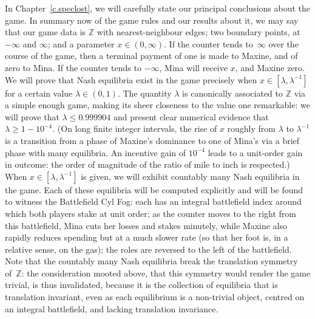 \documentclass[letterpaper,11pt,oneside,reqno]{amsbook}
\newcommand{\Z}{\ensuremath{\mathbb{Z}}}
\numberwithin{figure}{chapter}
\theoremstyle{definition}
\theoremstyle{definition}
\theoremstyle{definition}
\theoremstyle{definition}
\theoremstyle{definition}
\begin{document}
 In Chapter~\ref{c.speclost}, we will 
  carefully state our principal conclusions about the game. In summary now of the game rules and our results about it, we may say that
 our game data is $\Z$ with nearest-neighbour edges; two boundary points, at $-\infty$ and $\infty$; and a parameter $x \in (0,\infty)$. 
  If the counter tends to~$\infty$ over the course of the game, then a
  terminal payment of one is made to Maxine, and of zero to Mina. If the counter tends to $-\infty$, Mina will receive $x$, and Maxine zero. We will prove that Nash equilibria exist in the game precisely when $x \in [\lambda,\lambda^{-1}]$ for a certain value $\lambda \in (0,1)$. 
 The quantity $\lambda$ is canonically associated to $\Z$ via a simple enough game, 
 making its sheer closeness to the value one remarkable: we will prove that $\lambda \leq 0.999904$ and present clear numerical evidence that $\lambda \geq 1 - 10^{-4}$.
 (On long finite integer intervals, the rise of $x$ roughly from $\lambda$ to $\lambda^{-1}$ is a transition from a phase of Maxine's dominance to one of Mina's via a brief phase with many equilibria.
 An incentive gain of $10^{-4}$ leads to a unit-order gain in outcome: the order of magnitude of the ratio of mile to inch is respected.)
    When $x \in [\lambda,\lambda^{-1}]$ is given, we will exhibit countably many Nash equilibria in the game. Each of these equilibria will be computed explicitly and will be found to witness the Battlefield Cyl Fog: each has an integral battlefield index around which both players stake at unit order; as the counter moves to the right from this battlefield, Mina cuts her losses and stakes minutely, while Maxine also rapidly reduces spending but at a much slower rate (so that her foot is, in a relative sense, on the gas); the roles are reversed to the left of the battlefield. 
 Note that the  countably many Nash equilibria  break  the translation symmetry of~$\Z$: the consideration mooted above, that this symmetry would render the game trivial, is thus invalidated, because it is the collection of equilibria that is translation invariant, even as each equilibrium is a non-trivial object, centred on an integral battlefield, and lacking translation invariance. 
 
\end{document}

